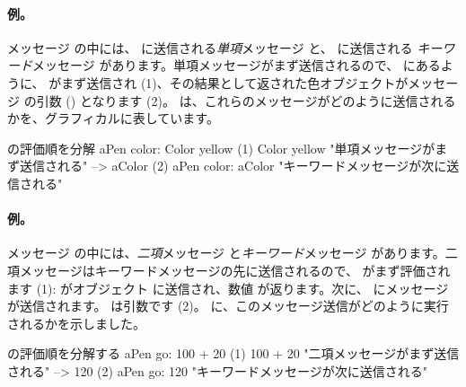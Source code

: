 \documentclass[a4paper,10pt,twoside]{book}
\begin{document}


\paragraph{例。}
メッセージ  の中には、 に送信される\emph{単項}メッセージ と、 に送信される \emph{キーワード}メッセージ  があります。単項メッセージがまず送信されるので、 にあるように、 がまず送信され (1)、その結果として返された色オブジェクトがメッセージ  の引数 () となります (2)。
 は、これらのメッセージがどのように送信されるかを、グラフィカルに表しています。

\begin{example}[decColor]{の評価順を分解}{}
        aPen color: Color yellow
(1)                       Color yellow        "単項メッセージがまず送信される"
                        --> aColor
(2)   aPen color: aColor                 "キーワードメッセージが次に送信される"
\end{example}

\paragraph{例。} メッセージ  の中には、\emph{二項}メッセージ  と\emph{キーワード}メッセージ  があります。二項メッセージはキーワードメッセージの先に送信されるので、 がまず評価されます (1):  がオブジェクト  に送信され、数値  が返ります。次に、 にメッセージ  が送信されます。 は引数です (2)。
に、このメッセージ送信がどのように実行されるかを示しました。

\begin{example}[decGo]{の評価順を分解する}{}
      aPen go: 100 + 20   
(1)                 100 + 20           "二項メッセージがまず送信される"
                   -->   120
(2)  aPen go: 120                   "キーワードメッセージが次に送信される"
\end{example}
\end{document}
